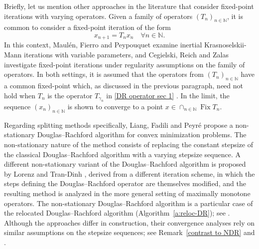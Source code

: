 \documentclass[a4paper,12pt]{article}
\DeclareMathOperator{\Fix}{Fix}
\begin{document}
Briefly, let us mention other approaches in the literature that consider fixed-point iterations with varying operators. Given a family of operators $(T_n)_{n \in \mathbb{N}}$, it is common to consider a fixed-point iteration of the form
$$x_{n+1} = T_{n}x_n \quad\forall n \in \mathbb{N}. $$
In this context, Maul{\'e}n, Fierro and Peypouquet \cite{maulen2024inertial} examine inertial Krasnoselskii-Mann iterations with variable parameters, and Cegielski, Reich and Zalas \cite{cegielski2018regular} investigate fixed-point iterations under regularity assumptions on the family of operators. In both settings, it is assumed that the operators from $(T_n)_{n \in \mathbb{N}}$ have a common fixed-point which, as discussed in the previous paragraph, need not hold when $T_n $ is the operator   $T_{\gamma_n}$ in \eqref{DR operator sec 1} \cite[Remark 4.13]{atenas2025relocated}.  In the limit, the sequence $(x_n)_{n \in \mathbb{N}}$ is shown to converge to a point $x \in \cap_{n \in \mathbb{N}} \Fix T_n$. 

Regarding splitting methods specifically, Liang, Fadili and Peyr\'e \cite{liang2017local} propose a non-stationary Douglas--Rachford algorithm for convex minimization problems. The non-stationary nature of the method consists of replacing the constant stepsize of the classical Douglas--Rachford algorithm with a varying stepsize sequence. A different non-stationary variant of the Douglas--Rachford algorithm is proposed by Lorenz and Tran-Dinh \cite{lorenz2019non}, derived from a different iteration scheme, in which the steps defining the Douglas--Rachford operator are themselves modified, and the resulting method is analyzed in the more general setting of maximally monotone operators.  The non-stationary Douglas--Rachford algorithm \cite[eq. (12)]{lorenz2019non}  is a particular case of the relocated Douglas--Rachford algorithm (Algorithm~\ref{a:reloc-DR}); see \cite[Remark~4.12]{atenas2025relocated}. 
Although the approaches \cite{liang2017local,lorenz2019non,atenas2025relocated} differ in construction, their convergence analyses rely on similar assumptions on the stepsize sequences; see Remark~\ref{contrast to NDR} and \cite[Remark 4.10(iii)]{atenas2025relocated}.
\end{document}
